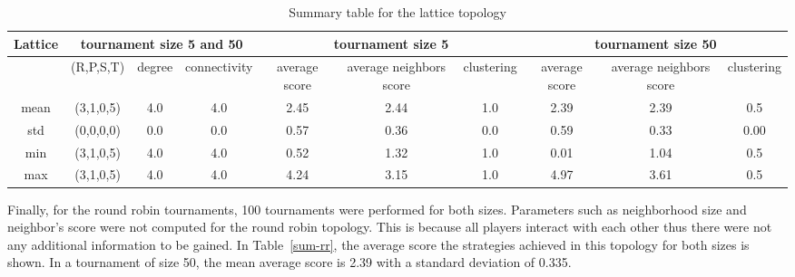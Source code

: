 \begin{table}[!hbtp]
	\centering
	\begin{adjustbox}{width=1\textwidth, height=0.15\textwidth}
		\small
		\begin{tabular}{cccccccccc}
				\toprule
			Lattice & \multicolumn{3}{|c|}{tournament size 5 and 50} & \multicolumn{3}{c|}{tournament size 5} & \multicolumn{3}{c}{tournament size 50}                            \\ \midrule
			     & (R,P,S,T) & degree & connectivity & average score & average neighbors score & clustering & average score & average neighbors score & clustering \\ \midrule
			mean & (3,1,0,5) & 4.0    & 4.0          & 2.45          & 2.44                    & 1.0        & 2.39          & 2.39                    & 0.5        \\ \midrule
			std  & (0,0,0,0) & 0.0    & 0.0          & 0.57          & 0.36                    & 0.0        & 0.59          & 0.33                    & 0.00       \\ \midrule
			min  & (3,1,0,5) & 4.0    & 4.0          & 0.52          & 1.32                    & 1.0        & 0.01          & 1.04                    & 0.5        \\ \midrule
			max  & (3,1,0,5) & 4.0    & 4.0          & 4.24          & 3.15                    & 1.0        & 4.97          & 3.61                    & 0.5        \\ \bottomrule
		\end{tabular}
	\end{adjustbox}
	\caption{Summary table for the lattice topology}
	\label{sum-lattice}
\end{table}

Finally, for the round robin tournaments, 100 tournaments were performed for both
sizes. Parameters such as neighborhood size and neighbor's score
were not computed for the round robin topology. This is because all players
interact with each other thus there were not any additional information to be
gained. In Table~\ref{sum-rr}, the average score the strategies achieved
in this topology for both sizes is shown. In a tournament of size 50, the mean average
score is 2.39 with a standard deviation of 0.335.

